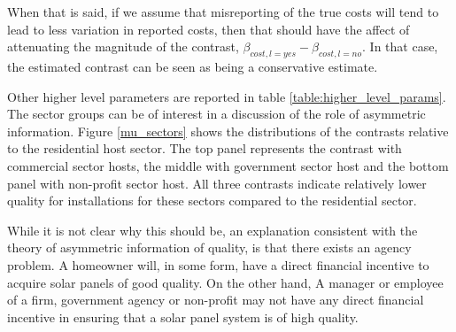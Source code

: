 \documentclass[12pt]{article}
\begin{document}
When that is said, if we assume that misreporting of the true costs will tend to lead to less variation in reported costs, then that should have the affect of attenuating the magnitude of the contrast, $\beta_{cost, l=yes} - \beta_{cost, l=no}$. In that case, the estimated contrast can be seen as being a conservative estimate.

Other higher level parameters are reported in table \ref{table:higher_level_params}. The sector groups can be of interest in a discussion of the role of asymmetric information. Figure \ref{mu_sectors} shows the distributions of the contrasts relative to the residential host sector. The top panel represents the contrast with commercial sector hosts, the middle with government sector host and the bottom panel with non-profit sector host. All three contrasts indicate relatively lower quality for installations for these sectors compared to the residential sector.

While it is not clear why this should be, an explanation consistent with the theory of asymmetric information of quality, is that there exists an agency problem. A homeowner will, in some form, have a direct financial incentive to acquire solar panels of good quality. On the other hand, A manager or employee of a firm, government agency or non-profit may not have any direct financial incentive in ensuring that a solar panel system is of high quality.
\end{document}
